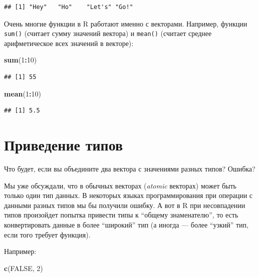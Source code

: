 \documentclass[]{book}
\newenvironment{Shaded}{\begin{snugshade}}{\end{snugshade}}
\newcommand{\KeywordTok}[1]{\textcolor[rgb]{0.13,0.29,0.53}{\textbf{#1}}}
\newcommand{\DecValTok}[1]{\textcolor[rgb]{0.00,0.00,0.81}{#1}}
\newcommand{\OtherTok}[1]{\textcolor[rgb]{0.56,0.35,0.01}{#1}}
\newcommand{\OperatorTok}[1]{\textcolor[rgb]{0.81,0.36,0.00}{\textbf{#1}}}
\newcommand{\NormalTok}[1]{#1}
\begin{document}
\begin{verbatim}
## [1] "Hey"   "Ho"    "Let's" "Go!"
\end{verbatim}

Очень многие функции в R работают именно с векторами. Например, функции
\texttt{sum()} (считает сумму значений вектора) и \texttt{mean()}
(считает среднее арифметическое всех значений в векторе):

\begin{Shaded}
\begin{Highlighting}[]
\KeywordTok{sum}\NormalTok{(}\DecValTok{1}\OperatorTok{:}\DecValTok{10}\NormalTok{)}
\end{Highlighting}
\end{Shaded}

\begin{verbatim}
## [1] 55
\end{verbatim}

\begin{Shaded}
\begin{Highlighting}[]
\KeywordTok{mean}\NormalTok{(}\DecValTok{1}\OperatorTok{:}\DecValTok{10}\NormalTok{)}
\end{Highlighting}
\end{Shaded}

\begin{verbatim}
## [1] 5.5
\end{verbatim}

\section{Приведение типов}\label{coercion}

Что будет, если вы объедините два вектора с значениями разных типов?
Ошибка?

Мы уже обсуждали, что в обычных векторах (\emph{atomic} векторах) может
быть только один тип данных. В некоторых языках программирования при
операции с данными разных типов мы бы получили ошибку. А вот в R при
несовпадении типов произойдет попытка привести типы к ``общему
знаменателю'', то есть конвертировать данные в более ``широкий'' тип (а
иногда --- более ``узкий'' тип, если того требует функция).

Например:

\begin{Shaded}
\begin{Highlighting}[]
\KeywordTok{c}\NormalTok{(}\OtherTok{FALSE}\NormalTok{, }\DecValTok{2}\NormalTok{)}
\end{Highlighting}
\end{Shaded}
\end{document}

